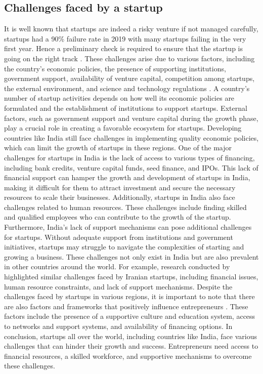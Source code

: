 \documentclass[12pt]{article}
\begin{document}
\subsection{Challenges faced by a startup}
It is well known that startups are indeed a risky venture if not managed carefully, startups had a 90\% failure rate in 2019 with many startups failing in the very first year. Hence a preliminary check is required to ensure that the startup is going on the right track \citep{bangdiwala2022predicting}. These challenges arise due to various factors, including the country's economic policies, the presence of supporting institutions, government support, availability of venture capital, competition among startups, the external environment, and science and technology regulations \citep{sundaram2022factors}.
A country's number of startup activities depends on how well its economic policies are formulated and the establishment of institutions to support startups\citep{sundaram2022factors}.
External factors, such as government support and venture capital during the growth phase, play a crucial role in creating a favorable ecosystem for startups\citep{sundaram2022factors}. Developing countries like India still face challenges in implementing quality economic policies, which can limit the growth of startups in these regions\citep{sundaram2022factors}.
One of the major challenges for startups in India is the lack of access to various types of financing, including bank credits, venture capital funds, seed finance, and IPOs. This lack of financial support can hamper the growth and development of startups in India, making it difficult for them to attract investment and secure the necessary resources to scale their businesses. Additionally, startups in India also face challenges related to human resources. These challenges include finding skilled and qualified employees who can contribute to the growth of the startup. Furthermore, India's lack of support mechanisms can pose additional challenges for startups.
Without adequate support from institutions and government initiatives, startups may struggle to navigate the complexities of starting and growing a business. These challenges not only exist in India but are also prevalent in other countries around the world. For example, research conducted by \cite{salamzadeh2015startup} highlighted similar challenges faced by Iranian startups, including financial issues, human resource constraints, and lack of support mechanisms. Despite the challenges faced by startups in various regions, it is important to note that there are also factors and frameworks that positively influence entrepreneurs \citep{rijal2021five}. These factors include the presence of a supportive culture and education system, access to networks and support systems, and availability of financing options. In conclusion, startups all over the world, including countries like India, face various challenges that can hinder their growth and success. Entrepreneurs need access to financial resources, a skilled workforce, and supportive mechanisms to overcome these challenges.
\end{document}
